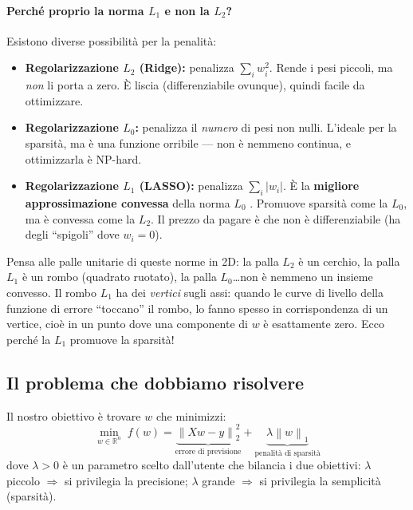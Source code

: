 \documentclass[a4paper,11pt]{article}
\theoremstyle{definition}
\newcommand{\R}{\mathbb{R}}
\newcommand{\norm}[1]{\left\lVert #1 \right\rVert}
\begin{document}
\paragraph{Perché proprio la norma $L_1$ e non la $L_2$?}
Esistono diverse possibilità per la penalità:
\begin{itemize}
  \item \textbf{Regolarizzazione $L_2$ (Ridge):} penalizza $\sum_i w_i^2$. Rende i pesi piccoli, ma \emph{non} li porta a zero. È liscia (differenziabile ovunque), quindi facile da ottimizzare.
  \item \textbf{Regolarizzazione $L_0$:} penalizza il \emph{numero} di pesi non nulli. L'ideale per la sparsità, ma è una funzione orribile --- non è nemmeno continua, e ottimizzarla è NP-hard.
  \item \textbf{Regolarizzazione $L_1$ (LASSO):} penalizza $\sum_i |w_i|$. È la \textbf{migliore approssimazione convessa} della norma $L_0$ \cite[Appendice A.8]{opt-notes}. Promuove sparsità come la $L_0$, ma è convessa come la $L_2$. Il prezzo da pagare è che non è differenziabile (ha degli ``spigoli'' dove $w_i = 0$).
\end{itemize}

\begin{analogia}
Pensa alle palle unitarie di queste norme in 2D: la palla $L_2$ è un cerchio, la palla $L_1$ è un rombo (quadrato ruotato), la palla $L_0$\ldots non è nemmeno un insieme convesso. Il rombo $L_1$ ha dei \emph{vertici} sugli assi: quando le curve di livello della funzione di errore ``toccano'' il rombo, lo fanno spesso in corrispondenza di un vertice, cioè in un punto dove una componente di $w$ è esattamente zero. Ecco perché la $L_1$ promuove la sparsità!
\end{analogia}

\subsection{Il problema che dobbiamo risolvere}
\label{subsec:il_problema}

Il nostro obiettivo è trovare $w$ che minimizzi:
\begin{equation}\label{eq:main_problem}
  \boxed{\min_{w \in \R^n}\; f(w) = \underbrace{\norm{Xw - y}_2^2}_{\text{errore di previsione}} + \underbrace{\lambda\norm{w}_1}_{\text{penalità di sparsità}}}
\end{equation}
dove $\lambda > 0$ è un parametro scelto dall'utente che bilancia i due obiettivi: $\lambda$ piccolo $\Rightarrow$ si privilegia la precisione; $\lambda$ grande $\Rightarrow$ si privilegia la semplicità (sparsità).
\end{document}
